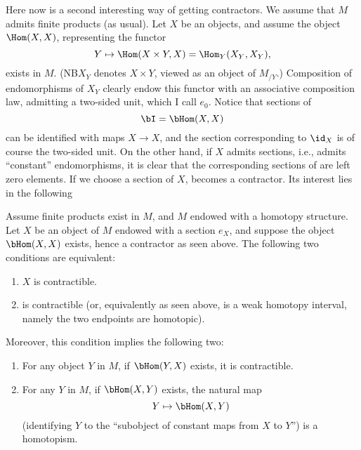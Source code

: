 Here now is a second interesting way of getting contractors. We assume
that $M$ admits finite products (as usual). Let $X$ be an objects, and
assume the object $\Hom(X,X)$, representing the functor
\[Y \mapsto \Hom(X\times Y,X) = \Hom_Y(X_Y,X_Y),\]
exists in $M$. (NB\enspace $X_Y$ denotes $X\times Y$, viewed as an object of
$M_{/Y}$.) Composition of endomorphisms of $X_Y$ clearly endow this
functor with an associative composition law, admitting a two-sided
unit, which I call $e_0$. Notice that sections of
\[\bI=\bHom(X,X)\]
can be identified with maps $X\to X$, and the section corresponding to
$\id_X$ is of course the two-sided unit. On the other hand, if $X$
admits sections, i.e., admits ``constant'' endomorphisms, it is
clear that the corresponding sections of \bI{} are left zero
elements. If we choose a section of $X$, \bI{} becomes a
contractor. Its interest lies in the following
\begin{proposition}
  Assume finite products exist in $M$, and $M$ endowed with a homotopy
  structure. Let $X$ be an object of $M$ endowed with a
  section $e_X$, and suppose the object $\bHom(X,X)$ exists, hence a
  contractor \bI{} as seen above. The following two conditions are
  equivalent:
  \begin{enumerate}[label=\alph*),font=\normalfont]
  \item\label{it:51.E.a}
    $X$ is contractible.
  \item\label{it:51.E.b}
    \bI{} is contractible \textup(or, equivalently as seen above,
    \bI{} is a weak homotopy interval, namely the two endpoints are homotopic\textup).
  \end{enumerate}
  Moreover, this condition implies the following two:
  \begin{enumerate}[label=\alph*),font=\normalfont,resume]
  \item\label{it:51.E.c}
    For any object $Y$ in $M$, if $\bHom(Y,X)$ exists, it is contractible.
  \item\label{it:51.E.d}
    For any $Y$ in $M$, if $\bHom(X,Y)$ exists, the natural map
    \[ Y \mapsto \bHom(X,Y)\]
    \textup(identifying $Y$ to the ``subobject of constant maps from
    $X$ to $Y$''\textup) is a homotopism.
  \end{enumerate}
\end{proposition}

